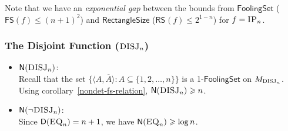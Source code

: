 \documentclass[usletter]{article}
\newcommand {\complexity}[1] {\ensuremath{\mathsf{#1}}}
\newcommand {\D}             {\complexity{D}}
\newcommand {\N}             {\complexity{N}}
\newcommand {\FS}            {\complexity{FS}}
\newcommand {\RS}[1]         {\ensuremath{\complexity{RS}_{#1}}}
\newcommand {\function}[2]  {\ensuremath{\textsc{#1}_{#2}}}
\newcommand {\range}[2]  {\ensuremath{\{#1{1},#1{2},\ldots,#1{#2}\}}}
\begin{document}
\noindent
Note that we have an \textit{exponential gap} between the bounds from \complexity{FoolingSet} ($\FS(f) \leqslant (n+1)^2$) and \complexity{RectangleSize} ($\RS{}(f) \leqslant 2^{1-n}$) for $f = \function{IP}{n}$.


\subsubsection*{The Disjoint Function (\function{DISJ}{n})}

\begin{itemize}
  \item $\N(\function{DISJ}{n})$: \\
  Recall that the set $\{\langle A, \overline{A} \rangle : A \subseteq \range{}{n}\}$ is a 1-\complexity{FoolingSet} on $M_{\function{DISJ}{n}}$. \\
  Using corollary~\ref{nondet-fs-relation}, $\N(\function{DISJ}{n}) \geqslant n$.

  \item $\N(\neg\function{DISJ}{n})$: \\
  Since $\D(\function{EQ}{n}) = n+1$, we have $\N(\function{EQ}{n}) \geqslant \log{n}$.
\end{itemize}
\end{document}
